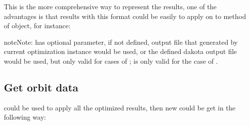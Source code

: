 \documentclass[letterpaper,10pt,english]{sphinxmanual}
\begin{document}
\begin{sphinxVerbatim}[commandchars=\\\{\},formatcom=\scriptsize]
  
\end{sphinxVerbatim}

This is the more comprehensive way to represent the results, one of the
advantages is that results with this format could be easily to apply on to
 method of  object, for instance:

\begin{sphinxVerbatim}[commandchars=\\\{\},formatcom=\scriptsize]
   
    \PYG{p}{[}\PYG{p}{]} \PYG{p}{[}\PYG{p}{]}
\end{sphinxVerbatim}

\begin{sphinxadmonition}{note}{Note:}
 has  optional parameter, if not
defined, output file that generated by current optimization
instance would be used, or the defined dakota output file would be used,
but only valid for cases of ;
 is only valid for
the case of .
\end{sphinxadmonition}


\subsection{Get orbit data}
\label{\detokenize{src/demos/demo6:get-orbit-data}}
 could be used to apply all the optimized results, then
new  could be get in the following way:
\end{document}
